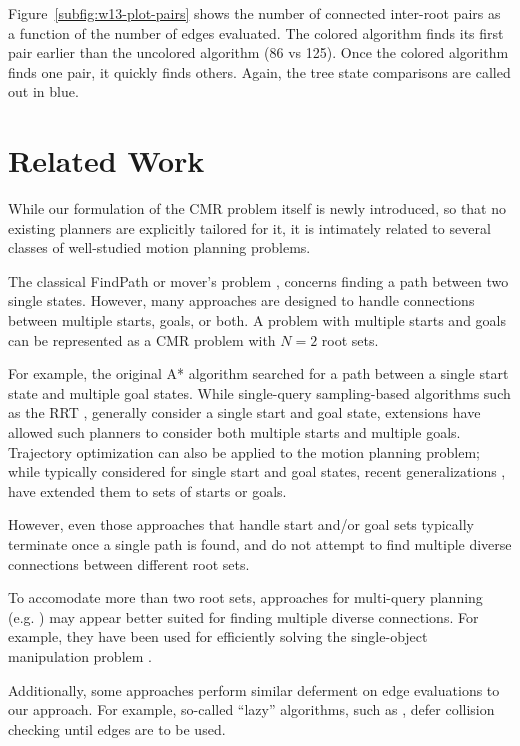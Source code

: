 Figure~\ref{subfig:w13-plot-pairs} shows the number of connected inter-root
pairs as a function of the number of edges evaluated.
The colored algorithm finds its first pair earlier than the uncolored
algorithm (86 vs 125).
Once the colored algorithm finds one pair,
it quickly finds others.
Again, the tree state comparisons are called out in blue.

\section{Related Work}
\label{sec:related}

While our formulation of the CMR problem itself is newly introduced,
so that no existing planners are explicitly tailored for it,
it is intimately related to several classes of well-studied
motion planning problems.

The classical FindPath or mover's problem
\cite{choset2005robotmotion}, \cite{lavalle2006planningbook}
concerns finding a path between two single states.
However,
many approaches are designed to handle connections
between multiple starts, goals, or both.
A problem with multiple starts and goals can be represented as a CMR problem
with $N=2$ root sets.

For example, the original A* algorithm \cite{hart1968astar}
searched for a path between a single start state
and multiple goal states.
While single-query sampling-based algorithms such as the RRT
\cite{lavallekuffner1999rrt}, \cite{kuffner2000rrtconnect}
generally consider a single start and goal state,
extensions \cite{berenson2009manifolds}
have allowed such planners to consider both multiple starts and multiple
goals.
Trajectory optimization can also be applied to the motion planning problem;
while typically considered for single start and goal states,
recent generalizations \cite{dragan2011goalsets}, \cite{schulman2013trajopt}
have extended them to sets of starts or goals.

However, even those approaches that handle start and/or goal sets
typically terminate once a single path is found,
and do not attempt to find multiple diverse connections
between different root sets.

To accomodate more than two root sets,
approaches for multi-query planning
(e.g. \cite{kavrakietal1996prm}) may appear better suited for finding
multiple diverse connections.
For example, they have been used for efficiently solving the single-object
manipulation problem \cite{simeon2004manipulation}.

Additionally, some approaches perform similar deferment on edge
evaluations to our approach.
For example, so-called ``lazy'' algorithms,
such as \cite{bohlin2000lazyprm}, \cite{sanchezante2001sbl}
defer collision checking until edges are to be used.

